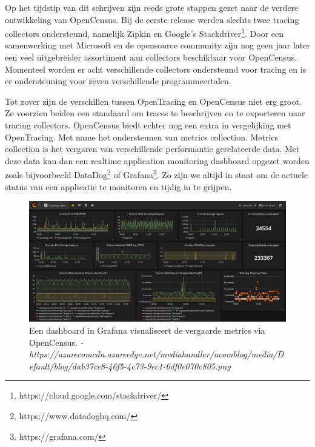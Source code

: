 Op het tijdstip van dit schrijven zijn reeds grote stappen gezet naar de verdere ontwikkeling van OpenCensus. Bij de eerste release werden slechts twee tracing collectors ondersteund, namelijk Zipkin en Google's Stackdriver\footnote{https://cloud.google.com/stackdriver/}. Door een samenwerking met Microsoft en de opensource community zijn nog geen jaar later een veel uitgebreider assortiment aan collectors beschikbaar voor OpenCensus. Momenteel worden er acht verschillende collectors ondersteund voor tracing en is er ondersteuning voor zeven verschillende programmeertalen.

Tot zover zijn de verschillen tussen OpenTracing en OpenCensus niet erg groot. Ze voorzien beiden een standaard om traces te beschrijven en te exporteren naar tracing collectors. OpenCensus biedt echter nog een extra in vergelijking met OpenTracing. Met name het ondersteunen van metrics collection. Metrics collection is het vergaren van verschillende performantie gerelateerde data. Met deze data kan dan een realtime application monitoring dashboard opgezet worden zoals bijvoorbeeld DataDog\footnote{https://www.datadoghq.com/} of Grafana\footnote{https://grafana.com/}. Zo zijn we altijd in staat om de actuele status van een applicatie te monitoren en tijdig in te grijpen.

\begin{figure}
	\includegraphics[width=\linewidth]{img/metrics.png}
	\caption{Een dashboard in Grafana visualiseert de vergaarde metrics via OpenCensus. \textit{- https://azurecomcdn.azureedge.net/mediahandler/acomblog/media/Default/blog/dab37ce8-46f5-4c73-9ec1-6df0e070c805.png}}
	\label{fig:metrics}
\end{figure}